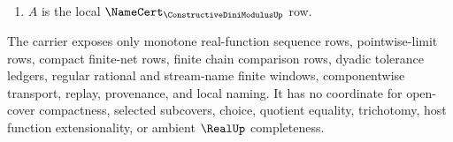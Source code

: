 \begin{definition}
\begin{enumerate}
\item $A$ is the local $\NameCert_{\ConstructiveDiniModulusUp}$ row.
\end{enumerate}
The carrier exposes only monotone real-function sequence rows, pointwise-limit rows, compact finite-net rows, finite chain comparison rows, dyadic tolerance ledgers, regular rational and stream-name finite windows, componentwise transport, replay, provenance, and local naming. It has no coordinate for open-cover compactness, selected subcovers, choice, quotient equality, trichotomy, host function extensionality, or ambient $\RealUp$ completeness.
\end{definition}

